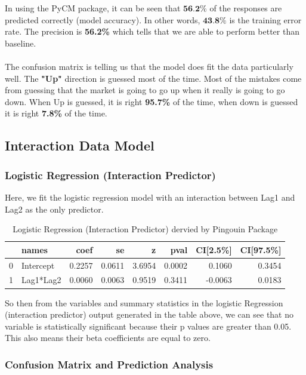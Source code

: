 \documentclass[12pt]{article}
\begin{document}
In using the PyCM package, it can be seen that $\textbf{56.2\%}$ of the responses are predicted correctly (model accuracy). In other words, $\textbf{43.8\%}$ is the training error rate. The precision is \textbf{56.2\%} which tells that we are able to perform better than baseline.\\\\
The confusion matrix is telling us that the model does fit the data particularly well. The \textbf{"Up"} direction is guessed most of the time. Most of the mistakes come from guessing that the market is going to go up when it really is going to go down. When Up is guessed, it is right \textbf{95.7\%} of the time, when down is guessed it is right \textbf{7.8\%} of the time.


\subsection{Interaction Data Model}
\subsubsection{Logistic Regression (Interaction Predictor)} 

Here, we fit the logistic regression model with an interaction between Lag1 and Lag2 as the only predictor. 

\begin{table}[h!]
	\centering
	\begin{tabular}{llrrrrrr}
		\hline
	{} &      names &    coef &      se &       z &    pval &  CI[2.5\%] &  CI[97.5\%] \\
	\hline
	0 &  Intercept &  0.2257 &  0.0611 &  3.6954 &  0.0002 &    0.1060 &     0.3454 \\
	1 &      Lag1*Lag2 &  0.0060 &  0.0063 &  0.9519 &  0.3411 &   -0.0063 &     0.0183 \\
		\hline
	\end{tabular}
	\caption{Logistic Regression (Interaction Predictor) dervied by Pingouin Package}
	\label{table_8}
\end{table}

So then from the variables and summary statistics in the logistic Regression (interaction predictor) output generated in the table above, we can see that no variable is statistically significant because their p values are greater than 0.05. This also means their beta coefficients are equal to zero.


\subsubsection{Confusion Matrix and Prediction Analysis}
\end{document}
